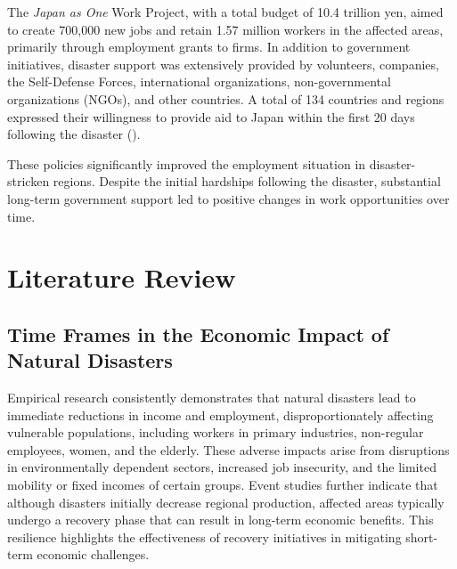 \documentclass[a4paper,12pt]{article}
\begin{document}
The \textit{Japan as One} Work Project, with a total budget of 10.4 trillion yen, aimed to create 700,000 new jobs and retain 1.57 million workers in the affected areas, primarily through employment grants to firms. In addition to government initiatives, disaster support was extensively provided by volunteers, companies, the Self-Defense Forces, international organizations, non-governmental organizations (NGOs), and other countries. A total of 134 countries and regions expressed their willingness to provide aid to Japan within the first 20 days following the disaster (\citet{Norio2011TheComments}).

These policies significantly improved the employment situation in disaster-stricken regions. Despite the initial hardships following the disaster, substantial long-term government support led to positive changes in work opportunities over time.



\section{Literature Review}
\subsection{Time Frames in the Economic Impact of Natural Disasters}

Empirical research consistently demonstrates that natural disasters lead to immediate reductions in income and employment, disproportionately affecting vulnerable populations, including workers in primary industries, non-regular employees, women, and the elderly. These adverse impacts arise from disruptions in environmentally dependent sectors, increased job insecurity, and the limited mobility or fixed incomes of certain groups. Event studies further indicate that although disasters initially decrease regional production, affected areas typically undergo a recovery phase that can result in long-term economic benefits. This resilience highlights the effectiveness of recovery initiatives in mitigating short-term economic challenges.
\end{document}
